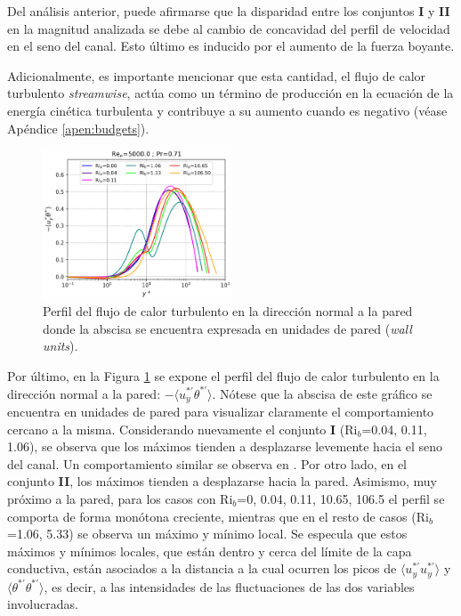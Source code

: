 Del análisis anterior, puede afirmarse que la disparidad entre los conjuntos \textbf{I} y \textbf{II} en la magnitud analizada se debe al cambio de concavidad del perfil de velocidad en el seno del canal. Esto último es inducido por el aumento de la fuerza boyante. 

Adicionalmente, es importante mencionar que esta cantidad, el flujo de calor turbulento \textit{streamwise}, actúa como un término de producción en la ecuación de la energía cinética turbulenta y contribuye a su aumento cuando es negativo (véase Apéndice \ref{apen:budgets}).


\begin{figure}[H] %
  \centering
  \includegraphics[width=0.5\textwidth]{figures/cap5/Re5000-Pr071/uyphif_profile.png}  
  \caption{Perfil del flujo de calor turbulento en la dirección normal a la pared donde la abscisa se encuentra expresada en unidades de pared (\textit{wall units}).}
  \label{fig:uyphi_f-Re5000-Pr071}
\end{figure}

Por último, en la Figura \ref{fig:uyphi_f-Re5000-Pr071} se expone el perfil del flujo de calor turbulento en la dirección normal a la pared: $-\langle u_y^{\ast \prime } \theta^{\ast \prime } \rangle$. Nótese que la abscisa de este gráfico se encuentra en unidades de pared para visualizar claramente el comportamiento cercano a la misma.   Considerando nuevamente el conjunto \textbf{I} (Ri$_b$=0.04, 0.11, 1.06), se observa que los máximos tienden a desplazarse levemente hacia el seno del canal. Un comportamiento similar se observa en \cite{you2003direct}. Por otro lado, en el conjunto \textbf{II}, los máximos tienden a desplazarse hacia la pared. Asimismo, muy próximo a la pared, para los casos con Ri$_b$=0, 0.04, 0.11, 10.65, 106.5 el perfil se comporta de forma monótona creciente, mientras que en el resto de casos (Ri$_b$=1.06, 5.33) se observa un máximo y mínimo local. Se especula que estos máximos y mínimos locales, que están dentro y cerca del límite de la capa conductiva, están asociados a la distancia a la cual ocurren los picos de $\langle u_y^{\ast \prime } u_y^{\ast \prime } \rangle$ y $\langle \theta^{\ast \prime } \theta^{\ast \prime } \rangle$, es decir, a las intensidades de las fluctuaciones de las dos variables involucradas.



